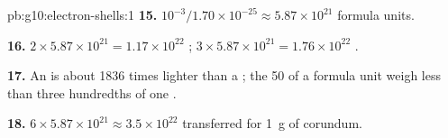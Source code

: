 \begin{solution}{pb:g10:electron-shells:1}
\textbf{15.} $10^{-3} / 1.70 \times 10^{-25} \approx 5.87 \times 10^{21}$
formula units.

\textbf{16.} $2 \times 5.87 \times 10^{21} = 1.17 \times 10^{22}$
 ; $3 \times 5.87 \times 10^{21} = 1.76 \times 10^{22}$
 .

\textbf{17.} An  is about 1836 times lighter than a ; the
50  of a formula unit weigh less than three hundredths of one
.

\textbf{18.} $6 \times 5.87 \times 10^{21} \approx 3.5 \times 10^{22}$
 transferred for \qty{1}{g} of corundum.
\end{solution}
